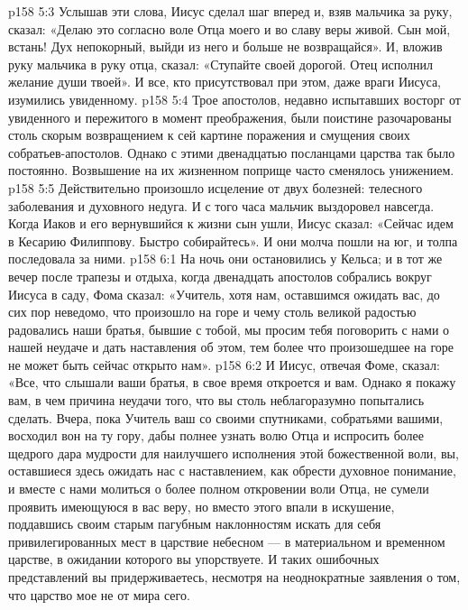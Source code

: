 \vs p158 5:3 Услышав эти слова, Иисус сделал шаг вперед и, взяв мальчика за руку, сказал: «Делаю это согласно воле Отца моего и во славу веры живой. Сын мой, встань! Дух непокорный, выйди из него и больше не возвращайся». И, вложив руку мальчика в руку отца, сказал: «Ступайте своей дорогой. Отец исполнил желание души твоей». И все, кто присутствовал при этом, даже враги Иисуса, изумились увиденному.
\vs p158 5:4 Трое апостолов, недавно испытавших восторг от увиденного и пережитого в момент преображения, были поистине разочарованы столь скорым возвращением к сей картине поражения и смущения своих собратьев\hyp{}апостолов. Однако с этими двенадцатью посланцами царства так было постоянно. Возвышение на их жизненном поприще часто сменялось унижением.
\vs p158 5:5 Действительно произошло исцеление от двух болезней: телесного заболевания и духовного недуга. И с того часа мальчик выздоровел навсегда. Когда Иаков и его вернувшийся к жизни сын ушли, Иисус сказал: «Сейчас идем в Кесарию Филиппову. Быстро собирайтесь». И они молча пошли на юг, и толпа последовала за ними.
\vs p158 6:1 На ночь они остановились у Кельса; и в тот же вечер после трапезы и отдыха, когда двенадцать апостолов собрались вокруг Иисуса в саду, Фома сказал: «Учитель, хотя нам, оставшимся ожидать вас, до сих пор неведомо, что произошло на горе и чему столь великой радостью радовались наши братья, бывшие с тобой, мы просим тебя поговорить с нами о нашей неудаче и дать наставления об этом, тем более что произошедшее на горе не может быть сейчас открыто нам».
\vs p158 6:2 И Иисус, отвечая Фоме, сказал: «Все, что слышали ваши братья, в свое время откроется и вам. Однако я покажу вам, в чем причина неудачи того, что вы столь неблагоразумно попытались сделать. Вчера, пока Учитель ваш со своими спутниками, собратьями вашими, восходил вон на ту гору, дабы полнее узнать волю Отца и испросить более щедрого дара мудрости для наилучшего исполнения этой божественной воли, вы, оставшиеся здесь ожидать нас с наставлением, как обрести духовное понимание, и вместе с нами молиться о более полном откровении воли Отца, не сумели проявить имеющуюся в вас веру, но вместо этого впали в искушение, поддавшись своим старым пагубным наклонностям искать для себя привилегированных мест в царствие небесном --- в материальном и временном царстве, в ожидании которого вы упорствуете. И таких ошибочных представлений вы придерживаетесь, несмотря на неоднократные заявления о том, что царство мое не от мира сего.
